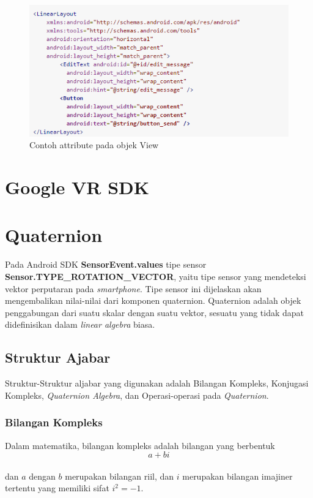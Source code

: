 \begin{figure}[htbp]
	\centering
		\includegraphics[scale=1]{Gambar/attribute-view.png}
	\caption{Contoh attribute pada objek View}
	\label{fig:attribute-view}
\end{figure}

 
\section{Google VR SDK}
\label{sec:google_vr_sdk}
\section{Quaternion}
\label{sec:quaternion}
Pada Android SDK \textbf{SensorEvent.values} \cite{android_developers} tipe sensor \textbf{Sensor.TYPE\_ROTATION\_VECTOR}, yaitu tipe sensor yang mendeteksi vektor perputaran pada \textit{smartphone}. Tipe sensor ini dijelaskan akan mengembalikan nilai-nilai dari komponen quaternion. 
Quaternion\cite{kuipers:1999} adalah objek penggabungan dari suatu skalar dengan suatu vektor, sesuatu yang tidak dapat didefinisikan dalam \textit{linear algebra} biasa. 
\subsection{Struktur Ajabar}
Struktur-Struktur aljabar yang digunakan adalah Bilangan Kompleks, Konjugasi Kompleks, \textit{Quaternion Algebra}, dan Operasi-operasi pada \textit{Quaternion}.
\subsubsection{Bilangan Kompleks}

Dalam matematika, bilangan kompleks adalah bilangan yang berbentuk\\
\[
	a+bi
\]\cite{kuipers:1999}\\
dan \(a\) dengan \(b\) merupakan bilangan riil, dan \(i\) merupakan bilangan imajiner tertentu yang memiliki sifat \(i^2=-1\).

